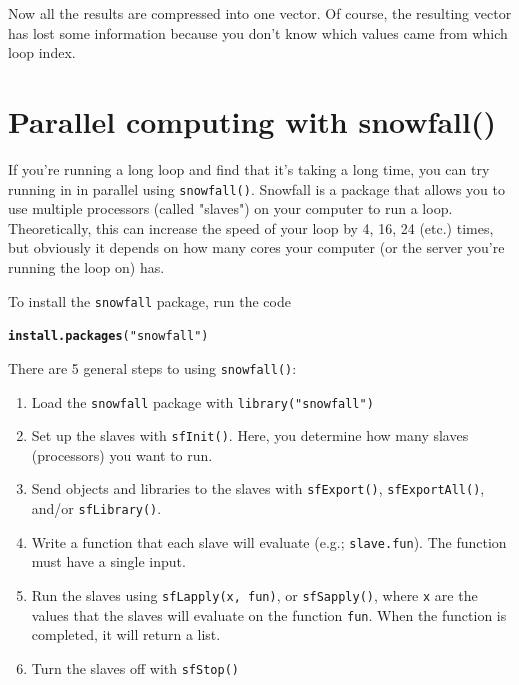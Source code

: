 \documentclass{tufte-book}\usepackage[]{graphicx}\usepackage[]{color}
\makeatletter
\newcommand{\hlstr}[1]{\textcolor[rgb]{0.192,0.494,0.8}{#1}}%
\newcommand{\hlstd}[1]{\textcolor[rgb]{0.345,0.345,0.345}{#1}}%
\newcommand{\hlkwd}[1]{\textcolor[rgb]{0.737,0.353,0.396}{\textbf{#1}}}%
\newenvironment{kframe}{%
 \def\at@end@of@kframe{}%
 \ifinner\ifhmode%
  \def\at@end@of@kframe{\end{minipage}}%
  \begin{minipage}{\columnwidth}%
 \fi\fi%
 \def\FrameCommand##1{\hskip\@totalleftmargin \hskip-\fboxsep
 \colorbox{shadecolor}{##1}\hskip-\fboxsep
     \hskip-\linewidth \hskip-\@totalleftmargin \hskip\columnwidth}%
 \MakeFramed {\advance\hsize-\width
   \@totalleftmargin\z@ \linewidth\hsize
   \@setminipage}}%
 {\par\unskip\endMakeFramed%
 \at@end@of@kframe}
\newenvironment{knitrout}{}{} %
\makeatother
\begin{document}
\begin{footnotesize}
Now all the results are compressed into one vector. Of course, the resulting vector has lost some information because you don't know which values came from which loop index.



\section{Parallel computing with snowfall()}

If you're running a long loop and find that it's taking a long time, you can try running in in parallel using \texttt{snowfall()}. Snowfall is a package that allows you to use multiple processors (called "slaves") on your computer to run a loop. Theoretically, this can increase the speed of your loop by 4, 16, 24 (etc.) times, but obviously it depends on how many cores your computer (or the server you're running the loop on) has.

To install the \texttt{snowfall} package, run the code

\begin{knitrout}
\color{fgcolor}\begin{kframe}
\begin{alltt}
\hlkwd{install.packages}\hlstd{(}\hlstr{"snowfall"}\hlstd{)}
\end{alltt}
\end{kframe}
\end{knitrout}

There are 5 general steps to using \texttt{snowfall()}: 

\begin{enumerate}

\item Load the \texttt{snowfall} package with \texttt{library("snowfall")}
\item Set up the slaves with \texttt{sfInit()}. Here, you determine how many slaves (processors) you want to run.
\item Send objects and libraries to the slaves with \texttt{sfExport()}, \texttt{sfExportAll()}, and/or \texttt{sfLibrary()}.
\item Write a function that each slave will evaluate (e.g.; \texttt{slave.fun}). The function must have a single input.
\item Run the slaves using \texttt{sfLapply(x, fun)}, or \texttt{sfSapply()}, where \texttt{x} are the values that the slaves will evaluate on the function \texttt{fun}. When the function is completed, it will return a list.
\item Turn the slaves off with \texttt{sfStop()}


\end{enumerate}
\end{footnotesize}
\end{document}
